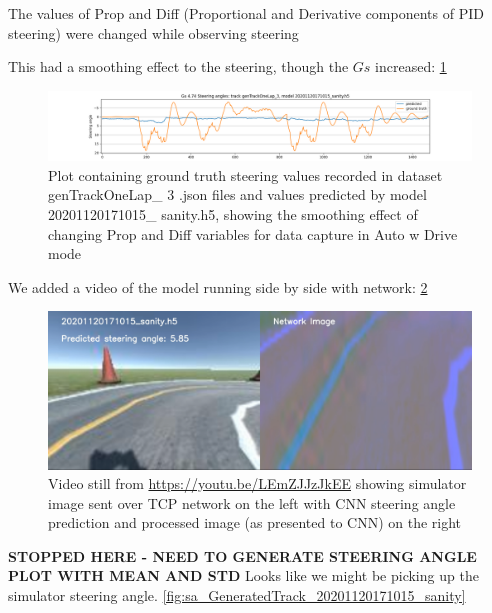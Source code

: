 The values of Prop and Diff (Proportional and Derivative components of PID steering) were changed while observing steering 

This had a smoothing effect to the steering, though the $Gs$ increased:
 \ref{fig:genTrackOneLap_3_20201120171015_sanity_gos} 
 
\begin{figure}[ht]
 \centering 
 \includegraphics[width=\textwidth]{Figures/sa_genTrackOneLap_3_20201120171015_sanity.h5.png}
 \caption{Plot containing ground truth steering values recorded in dataset genTrackOneLap\_ 3 .json files and values predicted by model 20201120171015\_ sanity.h5, showing the smoothing effect of changing Prop and Diff variables for data capture in Auto w Drive mode}
 \label{fig:genTrackOneLap_3_20201120171015_sanity_gos} 
\end{figure}

We added a video of the model running side by side with network:
\ref{fig:20201120171015_sanity_sim_network}

\begin{figure}[ht]
 \centering 
 \includegraphics[width=\textwidth]{Figures/20201120171015_sanity_sim_network.png}
 \caption{Video still from \href{https://youtu.be/LEmZJJzJkEE}{https://youtu.be/LEmZJJzJkEE} showing simulator image sent over TCP network on the left with CNN steering angle prediction and processed image (as presented to CNN) on the right}
 \label{fig:20201120171015_sanity_sim_network} 
\end{figure}

\textbf{STOPPED HERE - NEED TO GENERATE STEERING ANGLE PLOT WITH MEAN AND STD} Looks like we might be picking up the simulator steering angle.  \ref{fig:sa_GeneratedTrack_20201120171015_sanity}


